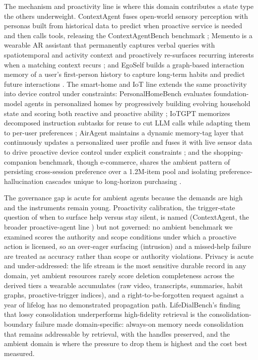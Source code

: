 The mechanism and proactivity line is where this domain contributes a state type the others underweight. ContextAgent fuses open-world sensory perception with personas built from historical data to predict when proactive service is needed and then calls tools, releasing the ContextAgentBench benchmark \citep{yang2025contextagent}; Memento is a wearable AR assistant that permanently captures verbal queries with spatiotemporal and activity context and proactively re-surfaces recurring interests when a matching context recurs \citep{kim2026memento}; and EgoSelf builds a graph-based interaction memory of a user's first-person history to capture long-term habits and predict future interactions \citep{wang2026egoself}. The smart-home and IoT line extends the same proactivity into device control under constraints: PersonalHomeBench evaluates foundation-model agents in personalized homes by progressively building evolving household state and scoring both reactive and proactive ability \citep{bharadwaj2026personalhomebench}; IoTGPT memorizes decomposed instruction subtasks for reuse to cut LLM calls while adapting them to per-user preferences \citep{yu2026iotgpt}; AirAgent maintains a dynamic memory-tag layer that continuously updates a personalized user profile and fuses it with live sensor data to drive proactive device control under explicit constraints \citep{men2026airagent}; and the shopping-companion benchmark, though e-commerce, shares the ambient pattern of persisting cross-session preference over a 1.2M-item pool and isolating preference-hallucination cascades unique to long-horizon purchasing \citep{yu2026shoppingcompanion}.

The governance gap is acute for ambient agents because the demands are high and the instruments remain young. Proactivity calibration, the trigger-state question of when to surface help versus stay silent, is named (ContextAgent, the broader proactive-agent line \citep{lu2024proactiveagent}) but not governed: no ambient benchmark we examined scores the authority and scope conditions under which a proactive action is licensed, so an over-eager surfacing (intrusion) and a missed-help failure are treated as accuracy rather than scope or authority violations. Privacy is acute and under-addressed: the life stream is the most sensitive durable record in any domain, yet ambient resources rarely score deletion completeness across the derived tiers a wearable accumulates (raw video, transcripts, summaries, habit graphs, proactive-trigger indices), and a right-to-be-forgotten request against a year of lifelog has no demonstrated propagation path. LifeDialBench's finding that lossy consolidation underperforms high-fidelity retrieval is the consolidation-boundary failure made domain-specific: always-on memory needs consolidation that remains addressable by retrieval, with the handles preserved, and the ambient domain is where the pressure to drop them is highest and the cost best measured.


